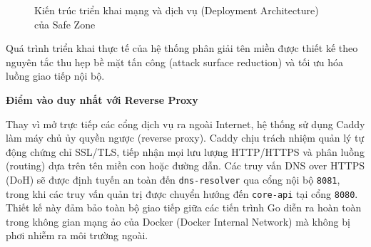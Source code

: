 \begin{figure}[H]
    \caption{Kiến trúc triển khai mạng và dịch vụ (Deployment Architecture) của Safe Zone}
    \label{fig:deployment_architecture}
\end{figure}

Quá trình triển khai thực tế của hệ thống phân giải tên miền được thiết kế theo nguyên tắc thu hẹp bề mặt tấn công (attack surface reduction) và tối ưu hóa luồng giao tiếp nội bộ.

\textbf{Điểm vào duy nhất với Reverse Proxy}

Thay vì mở trực tiếp các cổng dịch vụ ra ngoài Internet, hệ thống sử dụng Caddy làm máy chủ ủy quyền ngược (reverse proxy). Caddy chịu trách nhiệm quản lý tự động chứng chỉ SSL/TLS, tiếp nhận mọi lưu lượng HTTP/HTTPS và phân luồng (routing) dựa trên tên miền con hoặc đường dẫn. Các truy vấn DNS over HTTPS (DoH) sẽ được định tuyến an toàn đến \texttt{dns-resolver} qua cổng nội bộ \texttt{8081}, trong khi các truy vấn quản trị được chuyển hướng đến \texttt{core-api} tại cổng \texttt{8080}. Thiết kế này đảm bảo toàn bộ giao tiếp giữa các tiến trình Go diễn ra hoàn toàn trong không gian mạng ảo của Docker (Docker Internal Network) mà không bị phơi nhiễm ra môi trường ngoài.

